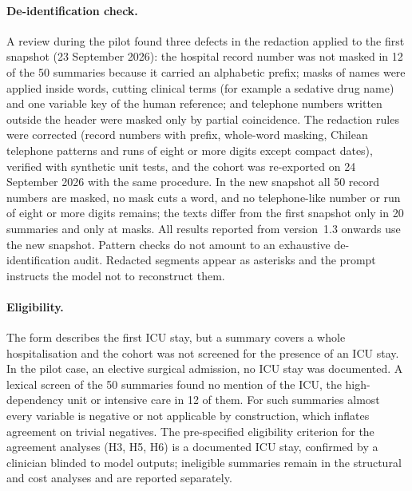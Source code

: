 \paragraph{De-identification check.} A review during the pilot found three defects in the redaction applied
to the first snapshot (23 September 2026): the hospital record number was not masked in 12 of the 50
summaries because it carried an alphabetic prefix; masks of names were applied inside words, cutting
clinical terms (for example a sedative drug name) and one variable key of the human reference; and telephone
numbers written outside the header were masked only by partial coincidence. The redaction rules were
corrected (record numbers with prefix, whole-word masking, Chilean telephone patterns and runs of eight or
more digits except compact dates), verified with synthetic unit tests, and the cohort was re-exported on
24 September 2026 with the same procedure. In the new snapshot all 50 record numbers are masked, no mask cuts
a word, and no telephone-like number or run of eight or more digits remains; the texts differ from the first
snapshot only in 20 summaries and only at masks. All results reported from version~1.3 onwards use the new
snapshot.  Pattern checks do not amount to an
exhaustive de-identification audit. Redacted segments appear as asterisks and the prompt instructs the
model not to reconstruct them.

\paragraph{Eligibility.} The form describes the first ICU stay, but a summary covers a whole hospitalisation
and the cohort was not screened for the presence of an ICU stay. In the pilot case, an elective surgical
admission, no ICU stay was documented. A lexical screen of the 50 summaries found no mention of the ICU,
the high-dependency unit or intensive care in 12 of them. For such summaries almost every variable is
negative or not applicable by construction, which inflates agreement on trivial negatives. The
pre-specified eligibility criterion for the agreement analyses (H3, H5, H6) is a documented ICU stay,
confirmed by a clinician blinded to model outputs; ineligible summaries remain in the structural and cost
analyses and are reported separately. 

